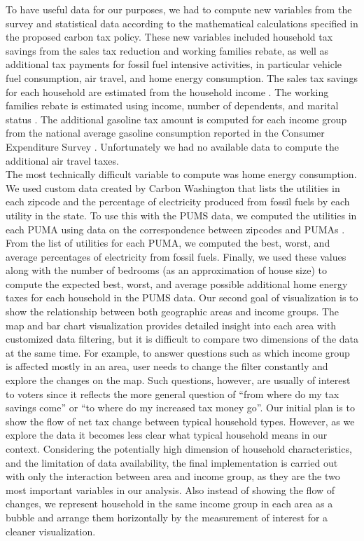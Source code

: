\documentclass{sigchi}
\begin{document}
To have useful data for our purposes, we had to compute new variables from the survey and statistical data according to the mathematical calculations specified in the proposed carbon tax policy. These new variables included household tax savings from the sales tax reduction and working families rebate, as well as additional tax payments for fossil fuel intensive activities, in particular vehicle fuel consumption, air travel, and home energy consumption. The sales tax savings for each household are estimated from the household income \cite{salesTax}. The working families rebate is estimated using income, number of dependents, and marital status \cite{eitc}. The additional gasoline tax amount is computed for each income group from the national average gasoline consumption reported in the Consumer Expenditure Survey \cite{ces}. Unfortunately we had no available data to compute the additional air travel taxes. \\

The most technically difficult variable to compute was home energy consumption. We used custom data created by Carbon Washington that lists the utilities in each zipcode and the percentage of electricity produced from fossil fuels by each utility in the state. To use this with the PUMS data, we computed the utilities in each PUMA using data on the correspondence between zipcodes and PUMAs \cite{missouri}. From the list of utilities for each PUMA, we computed the best, worst, and average percentages of electricity from fossil fuels. Finally, we used these values along with the number of bedrooms (as an approximation of house size) to compute the expected best, worst, and average possible additional home energy taxes for each household in the PUMS data.
Our second goal of visualization is to show the relationship between both geographic areas and income groups. The map and bar chart visualization provides detailed insight into each area with customized data filtering, but it is difficult to compare two dimensions of the data at the same time. For example, to answer questions such as which income group is affected mostly in an area, user needs to change the filter constantly and explore the changes on the map. Such questions, however, are usually of interest to voters since it reflects the more general question of ``from where do my tax savings come'' or ``to where do my increased tax money go''. Our initial plan is to show the flow of net tax change between typical household types.  However, as we explore the data it becomes less clear what typical household means in our context. Considering the potentially high dimension of household characteristics, and the limitation of data availability, the final implementation is carried out with only the interaction between area and income group, as they are the two most important variables in our analysis.  Also instead of showing the flow of changes, we represent household in the same income group in each area as a bubble and arrange them horizontally by the measurement of interest for a cleaner visualization.
\end{document}
